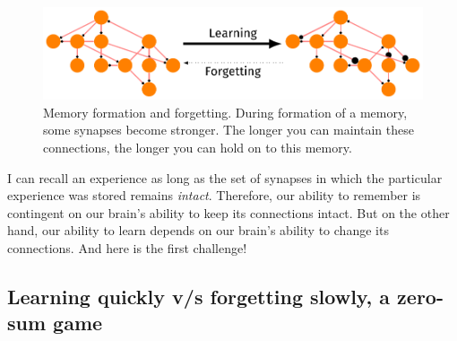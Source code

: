 \documentclass[]{resonance}
\begin{document}
\begin{figure}[!b] 
    \caption{Memory formation and forgetting. During formation of
    a memory, some synapses become stronger. The longer you can maintain these
    connections, the longer you can hold on to this memory.}
   \label{fig:engram}
   \includegraphics[width=\linewidth]{engram.pdf} 
\end{figure}

I can recall an experience as long as the set of synapses in which the
particular experience was stored remains \emph{intact}. Therefore, our
ability to remember is contingent on our brain's ability to keep its connections
intact.  But on the other hand, our ability to learn depends on our brain's
ability to change its connections. And here is the first challenge!

\subsection{Learning quickly v/s forgetting slowly, a zero-sum game}\label{subsec:zero_sum} 
\end{document}
